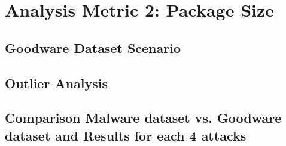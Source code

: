 \section{Analysis Metric 2: Package Size}

\subsection{Goodware Dataset Scenario}


\subsection{Outlier Analysis}



\subsection{Comparison Malware dataset vs. Goodware dataset and Results for each 4 attacks}

\newpage



